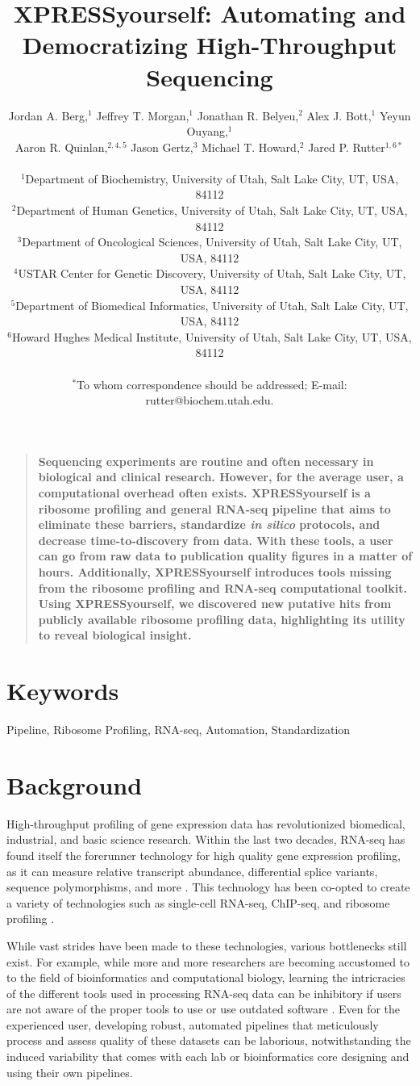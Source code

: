 \documentclass[11pt, a4paper, oneside]{article}
\title{
XPRESSyourself: Automating and Democratizing High-Throughput Sequencing
}
\author{
Jordan A. Berg,$^{1}$ Jeffrey T. Morgan,$^{1}$ Jonathan R. Belyeu,$^{2}$ Alex J. Bott,$^{1}$ Yeyun Ouyang,$^{1}$\\
Aaron R. Quinlan,$^{2,4,5}$ Jason Gertz,$^{3}$ Michael T. Howard,$^{2}$ Jared P. Rutter$^{1,6\ast}$\\
\\
\normalsize{$^{1}$Department of Biochemistry, University of Utah, Salt Lake City, UT, USA, 84112}\\
\normalsize{$^{2}$Department of Human Genetics, University of Utah, Salt Lake City, UT, USA, 84112}\\
\normalsize{$^{3}$Department of Oncological Sciences, University of Utah, Salt Lake City, UT, USA, 84112}\\
\normalsize{$^{4}$USTAR Center for Genetic Discovery, University of Utah, Salt Lake City, UT, USA, 84112}\\
\normalsize{$^{5}$Department of Biomedical Informatics, University of Utah, Salt Lake City, UT, USA, 84112}\\
\normalsize{$^{6}$Howard Hughes Medical Institute, University of Utah, Salt Lake City, UT, USA, 84112}\\
\\
\normalsize{$^\ast$To whom correspondence should be addressed; E-mail: rutter@biochem.utah.edu.}
}
\date{}
\newenvironment{sciabstract}{%
\begin{quote} \bf}
{\end{quote}}
\begin{document}
\baselineskip24pt

\maketitle



\begin{sciabstract}
Sequencing experiments are routine and often necessary in biological and clinical research. However, for the average user, a computational overhead often exists. XPRESSyourself is a ribosome profiling and general RNA-seq pipeline that aims to eliminate these barriers, standardize \textit{in silico} protocols, and decrease time-to-discovery from data. With these tools, a user can go from raw data to publication quality figures in a matter of hours. Additionally, XPRESSyourself introduces tools missing from the ribosome profiling and RNA-seq computational toolkit. Using XPRESSyourself, we discovered new putative hits from publicly available ribosome profiling data, highlighting its utility to reveal biological insight.
\end{sciabstract}

\section*{Keywords}
Pipeline, Ribosome Profiling, RNA-seq, Automation, Standardization

\section{Background}
High-throughput profiling of gene expression data has revolutionized biomedical, industrial, and basic science research. Within the last two decades, RNA-seq has found itself the forerunner technology for high quality gene expression profiling, as it can measure relative transcript abundance, differential splice variants, sequence polymorphisms, and more \cite{byron_nrg}. This technology has been co-opted to create a variety of technologies such as single-cell RNA-seq, ChIP-seq, and ribosome profiling \cite{ingolia_science}. \par

While vast strides have been made to these technologies, various bottlenecks still exist. For example, while more and more researchers are becoming accustomed to to the field of bioinformatics and computational biology, learning the intricracies of the different tools used in processing RNA-seq data can be inhibitory if users are not aware of the proper tools to use or use outdated software \cite{costello_npjsba, funari_science}. Even for the experienced user, developing robust, automated pipelines that meticulously process and assess quality of these datasets can be laborious, notwithstanding the induced variability that comes with each lab or bioinformatics core designing and using their own pipelines. \par
\end{document}
